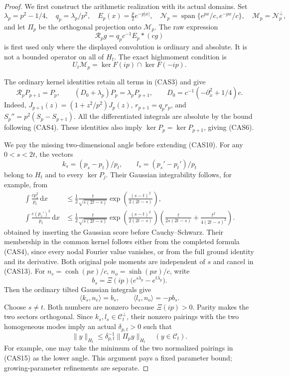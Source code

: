 \documentclass[11pt]{article}
\theoremstyle{remark}\newtheorem{remark}[theorem]{Remark}
\newcommand{\dd}{\,\mathrm d}
\begin{document}
\begin{proof}
We first construct the arithmetic realization with its actual
domains. Set
\[
 \lambda_p=p^2-1/4,\quad q_p=\lambda_p/p^2,\quad
 E_p(x)=\tfrac p2e^{-p|x|},\quad
 \mathcal N_p=\operatorname{span}\{e^{px}/c,e^{-px}/c\},\quad
 \mathcal M_p=\mathcal N_p^\perp,
\]
and let \(\Pi_p\) be the orthogonal projection onto \(\mathcal M_p\).
The raw expression
\[
 \mathcal R_pg=q_pc^{-1}E_p*(cg)                         \tag{CAS10}
\]
is first used only where the displayed convolution is ordinary and
absolute. It is not a bounded operator on all of \(H_t\).
The exact highmoment condition is
\[
 U_t\mathcal M_p=\ker F(ip)\cap\ker F(-ip).              \tag{CAS11}
\]

The ordinary kernel identities retain all terms in (CAS3) and give
\[
 \mathcal R_pP_{p+1}=P_p,
 \qquad
 (D_0+\lambda_p)P_p=\lambda_pP_{p+1},\qquad
 D_0=c^{-1}(-\partial_x^2+1/4)c.
                                                        \tag{CAS12}
\]
Indeed, \(J_{p+1}(z)=(1+z^2/p^2)J_p(z)\),
\(r_{p+1}=q_pr_p\), and
\(S_p''=p^2(S_p-S_{p+1})\).
All the differentiated integrals are absolute by the bound following
(CAS4). These identities also imply
\(\ker P_p=\ker P_{p+1}\), giving (CAS6).

We pay the missing two-dimensional angle before extending (CAS10).
For any \(0<s<2t\), the vectors
\[
 k_s=(p_s-p_t)/p_t,\qquad l_s=(p_s'-p_t')/p_t             \tag{CAS13}
\]
belong to \(H_t\) and to every \(\ker P_j\).
Their Gaussian integrability follows, for example, from
\[
\begin{aligned}
 \int\frac{c p_s^2}{p_t}\dd x
 &\le\frac12\frac{t}{\sqrt{s(2t-s)}}
       \exp\!\left(\frac{(s-t)^2}{2(2t-s)}\right),
 \\
 \int\frac{c (p_s')^2}{p_t}\dd x
 &\le\frac12\frac{t}{\sqrt{s(2t-s)}}
       \exp\!\left(\frac{(s-t)^2}{2(2t-s)}\right)
       \left(\frac{t}{2s(2t-s)}+
                         \frac{t^2}{4(2t-s)^2}\right).
\end{aligned}
                                                        \tag{CAS14}
\]
obtained by inserting the Gaussian score before Cauchy--Schwarz.
Their membership in the common kernel follows either from the
completed formula (CAS4), since every nodal Fourier value vanishes,
or from the full ground identity and its derivative. Both original
pole moments are independent of \(s\) and cancel in (CAS13).
For \(n_e=\cosh(px)/c\), \(n_o=\sinh(px)/c\), write
\[
 b_s=\Xi(ip)\bigl(e^{s\lambda_p}-e^{t\lambda_p}\bigr).
\]
Then the ordinary tilted Gaussian integrals give
\[
 \langle k_s,n_e\rangle=b_s,\qquad
 \langle l_s,n_o\rangle=-p b_s.                          \tag{CAS15}
\]
Choose \(s\ne t\). Both numbers are nonzero because \(\Xi(ip)>0\).
Parity makes the two sectors orthogonal. Since \(k_s,l_s\in
\mathcal C_t^\perp\), their nonzero pairings with the two homogeneous
modes imply an actual \(\delta_{p,t}>0\) such that
\[
 \|y\|_{H_t}\le\delta_{p,t}^{-1}\|\Pi_py\|_{H_t}
                     \quad(y\in\mathcal C_t).            \tag{CAS16}
\]
For example, one may take the minimum of the two normalized
pairings in (CAS15) as the lower angle. This argument pays a fixed
parameter bound; growing-parameter refinements are separate.


\end{proof}
\end{document}
